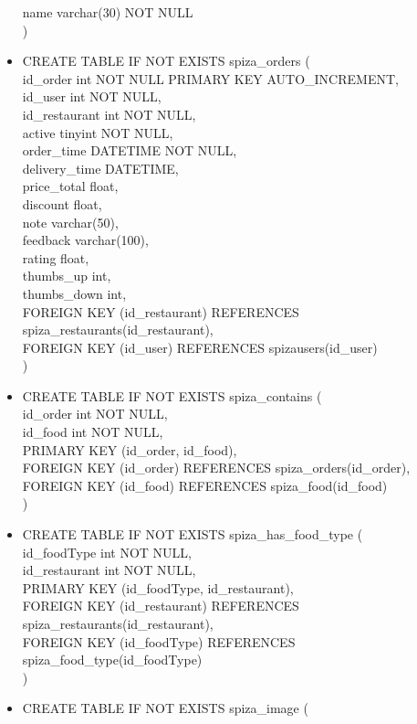 \documentclass[12pt]{scrartcl}
\begin{document}
\begin{itemize}
    name varchar(30) NOT NULL\\
    )
    \item[] CREATE TABLE IF NOT EXISTS spiza\_orders  (\\
    id\_order int NOT NULL PRIMARY KEY AUTO\_INCREMENT,\\
    id\_user int NOT NULL,\\
    id\_restaurant int NOT NULL,\\
    active tinyint NOT NULL,\\
    order\_time DATETIME NOT NULL,\\
    delivery\_time DATETIME,\\
    price\_total float,\\ 
    discount float,\\
    note varchar(50),\\
    feedback varchar(100),\\
    rating float,\\
    thumbs\_up int,\\
    thumbs\_down int, \\
    FOREIGN KEY (id\_restaurant) REFERENCES spiza\_restaurants(id\_restaurant),\\
    FOREIGN KEY (id\_user) REFERENCES spiza\textunderscore users(id\_user)\\
    )
    \item[] CREATE TABLE IF NOT EXISTS spiza\_contains (\\
    id\_order int NOT NULL,\\
    id\_food int NOT NULL,\\
    PRIMARY KEY (id\_order, id\_food),\\
    FOREIGN KEY (id\_order) REFERENCES spiza\_orders(id\_order),\\
    FOREIGN KEY (id\_food) REFERENCES spiza\_food(id\_food)\\
    )
    \item[] CREATE TABLE IF NOT EXISTS spiza\_has\_food\_type (\\
    id\_foodType int NOT NULL,\\
    id\_restaurant int NOT NULL,\\
    PRIMARY KEY (id\_foodType, id\_restaurant),\\
    FOREIGN KEY (id\_restaurant) REFERENCES spiza\_restaurants(id\_restaurant),\\
    FOREIGN KEY (id\_foodType) REFERENCES spiza\_food\_type(id\_foodType)\\
    )
    \item[] CREATE TABLE IF NOT EXISTS spiza\_image (\\

\end{itemize}
\end{document}
